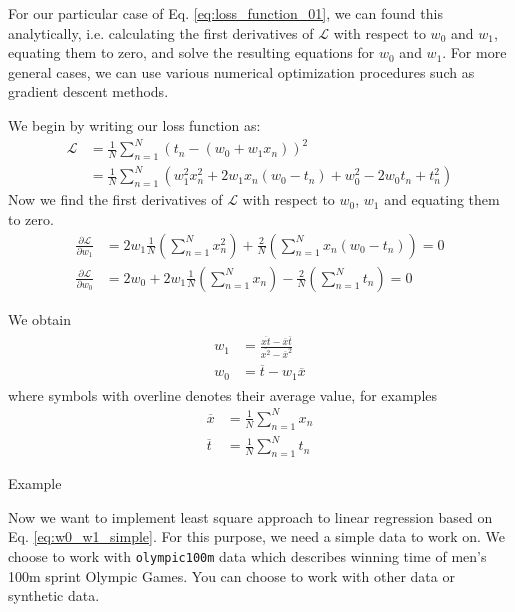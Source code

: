 \documentclass[a4paper,11pt]{article} %
\newcommand{\txtinline}[1]{\texttt{#1}}
\begin{document}
For our particular case of Eq. \eqref{eq:loss_function_01}, we can found this analytically,
i.e. calculating the first derivatives of $\mathcal{L}$ with respect to $w_0$ and $w_1$, equating
them to zero, and solve the resulting equations for $w_0$ and $w_1$.
For more general cases, we can use various numerical optimization procedures such as
gradient descent methods.

We begin by writing our loss function as:
\begin{align*}
\mathcal{L} & = \frac{1}{N} \sum_{n=1}^{N} \left( t_n - (w_0 + w_1 x_{n}) \right)^2 \\
& = \frac{1}{N} \sum_{n=1}^{N} \left( w_1^2 x_n^2 + 2w_{1}x_{n}(w_0 - t_n) + w_0^2 - 2w_0 t_n + t_n^2 \right)
\end{align*}
%
Now we find the first derivatives of $\mathcal{L}$ with respect to
$w_0$, $w_1$ and equating them to zero.
\begin{align*}
\frac{\partial\mathcal{L}}{\partial w_1} & = 2w_1 \frac{1}{N} \left( \sum_{n=1}^{N} x_n^2 \right) +
\frac{2}{N} \left( \sum_{n=1}^{N} x_{n} (w_0 - t_n) \right) = 0 \\
\frac{\partial \mathcal{L}}{\partial w_0} & = 2w_0 + 2w_1 \frac{1}{N} \left( \sum_{n=1}^{N} x_n \right) -
\frac{2}{N} \left( \sum_{n=1}^{N} t_n \right) = 0
\end{align*}

We obtain
\begin{align}
\begin{split}
w_{1} & = \frac{\overline{xt} - \overline{x}\overline{t}}{\overline{x^2} - \overline{x}^2} \\
w_{0} & = \overline{t} - w_{1} \overline{x}
\end{split}
\label{eq:w0_w1_simple}
\end{align}
where symbols with overline denotes their average value, for examples
\begin{align*}
\overline{x} & = \frac{1}{N} \sum_{n=1}^{N} x_{n} \\
\overline{t} & = \frac{1}{N} \sum_{n=1}^{N} t_{n}
\end{align*}

Example

Now we want to implement least square approach to linear regression based on
Eq. \ref{eq:w0_w1_simple}. For this purpose, we need a simple data to work on.
We choose to work with \txtinline{olympic100m} data which describes 
winning time of men's 100m sprint Olympic Games. You can choose to work with other
data or synthetic data.
\end{document}
